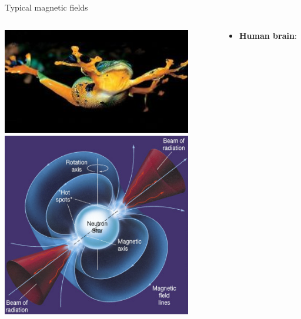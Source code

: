 \begin{frame}{Typical magnetic fields}

\begin{columns}
  \begin{column}{0.40\textwidth}
  {
   \begin{center}
    \includegraphics[width=0.88\textwidth]{./images/photos/levitating_frog_01.jpg}\\
    \vspace{0.1cm}
    \includegraphics[width=0.88\textwidth]{./images/misc/neutron_star.png}\\
   \end{center}
  }
  \end{column}
  \begin{column}{0.60\textwidth}
   \begin{itemize}
     \item {\bf Human brain}:\\

\end{itemize}
\end{column}
\end{columns}
\end{frame}
